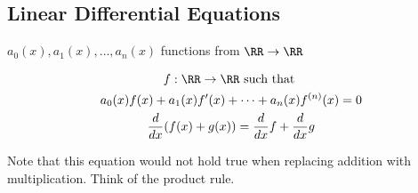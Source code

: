 \documentclass[class=scrartcl, crop=false]{standalone}
\begin{document}
\subsection{Linear Differential Equations}

$a_0(x), a_1(x), \dots, a_n(x)$ functions from $\RR \to \RR$ 

\begin{gather*}
  f: \RR \to \RR \ \text{such that} \ 
  \\
  a_0(x)f(x) + a_1(x)f'(x) + \dots + a_n(x)f^{(n)}(x) = 0
  \\
  \frac{d}{dx}(f(x) + g(x)) = \frac{d}{dx}f + \frac{d}{dx}g
\end{gather*}

Note that this equation would not hold true when replacing addition with multiplication. Think of the product rule.
\end{document}
